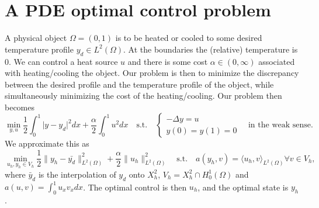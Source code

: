 \section{A PDE optimal control problem}
A physical object $\Omega = (0, 1)$ is to be heated or cooled to some desired temperature profile $y_d \in L^2 (\Omega)$. At the boundaries the (relative) temperature is $0$. 
We can control a heat source $u$ and there is some cost $\alpha \in (0, \infty)$ associated with heating/cooling the object.
Our problem is then to minimize the discrepancy between the desired profile and the temperature profile of the object, while simultaneously minimizing the cost of the heating/cooling.
Our problem then becomes
\begin{equation}
    \label{eq:OCP}
    \min_{y, u} \frac{1}{2} \int_0^1 \lvert y - y_d \rvert^2 dx + \frac{\alpha}{2}\int_0^1u^2 dx
    \quad \text{s.t.} \quad \begin{cases}
       -\Delta y = u \\
       y(0) = y(1) = 0
    \end{cases} 
    \quad \text{in the weak sense.}
\end{equation}
We approximate this as 
\begin{equation}
    \label{eq:OCP_FE}
    \min_{u_h, y_h \in V_h} \frac{1}{2} \lVert y_h - \bar{y_d} \rVert_ {L^2(\Omega)}^2 + \frac{\alpha}{2} \lVert u_h \rVert_{L^2(\Omega)}^2
    \quad \text{s.t.} \quad a(y_h, v) = \langle u_h, v \rangle_{L^2(\Omega)} \forall v \in V_h,
\end{equation}
where $\bar{y}_d$ is the interpolation of $y_d$ onto $X_h^2$, $V_h = X_h^2 \cap H_0^1 (\Omega)$ and $a(u, v) = \int_0^1 u_x v_x dx$.
The optimal control is then $u_h$, and the optimal state is $y_h$.


